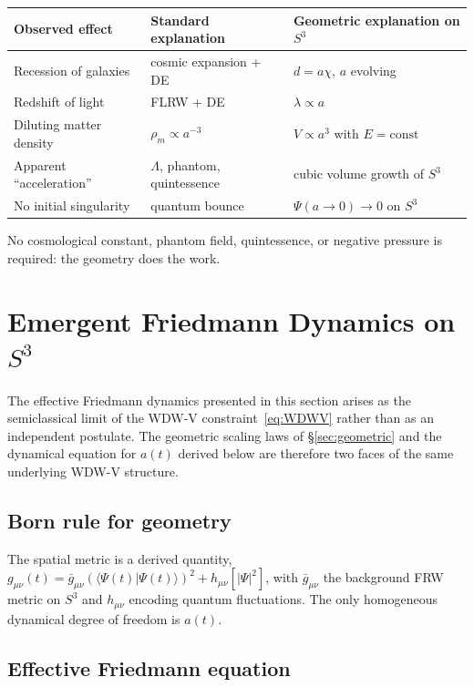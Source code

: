 \documentclass[12pt,a4paper]{article}
\theoremstyle{plain}
\theoremstyle{definition}
\begin{document}
\medskip
\begin{center}
\begin{tabular}{lll}
\toprule
Observed effect & Standard explanation & Geometric explanation on $S^3$ \\
\midrule
Recession of galaxies & cosmic expansion + DE & $d = a\chi$, $a$ evolving \\
Redshift of light & FLRW + DE & $\lambda\propto a$ \\
Diluting matter density & $\rho_m\propto a^{-3}$ &
  $V\propto a^3$ with $E=\mathrm{const}$ \\
Apparent ``acceleration'' & $\Lambda$, phantom, quintessence &
  cubic volume growth of $S^3$ \\
No initial singularity & quantum bounce &
  $\Psi(a\to 0)\to 0$ on $S^3$ \\
\bottomrule
\end{tabular}
\end{center}
\medskip

No cosmological constant, phantom field, quintessence, or negative pressure
is required: the geometry does the work.

\section{Emergent Friedmann Dynamics on $S^3$}
\label{sec:friedmann}

The effective Friedmann dynamics presented in this section arises as the
semiclassical limit of the WDW-V constraint~\eqref{eq:WDWV} rather than
as an independent postulate. The geometric scaling laws of
\S\ref{sec:geometric} and the dynamical equation for $a(t)$ derived below
are therefore two faces of the same underlying WDW-V structure.

\subsection{Born rule for geometry}

The spatial metric is a derived quantity,
$g_{\mu\nu}(t) = \bar g_{\mu\nu}(\langle\Psi(t)|\Psi(t)\rangle)^2
+ h_{\mu\nu}[|\Psi|^2]$,
with $\bar g_{\mu\nu}$ the background FRW metric on $S^3$ and $h_{\mu\nu}$
encoding quantum fluctuations. The only homogeneous dynamical degree of
freedom is $a(t)$.

\subsection{Effective Friedmann equation}
\end{document}
